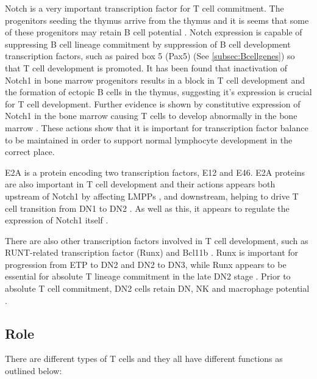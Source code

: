 Notch is a very important transcription factor for T cell commitment.
The progenitors seeding the thymus arrive from the thymus and it is seems that some of these progenitors may retain B cell potential \citep{Porritt2004}.
Notch expression is capable of suppressing B cell lineage commitment by suppression of B cell development transcription factors, such as paired box 5 (Pax5) (See \cref{subsec:Bcellgenes}) so that T cell development is promoted.
It has been found that inactivation of Notch1 in bone marrow progenitors results in a block in T cell development and the formation of ectopic B cells in the thymus, suggesting it's expression is crucial for T cell development.
Further evidence is shown by constitutive expression of Notch1 in the bone marrow causing T cells to develop abnormally in the bone marrow \citep{Radtke2013}.
These actions show that it is important for transcription factor balance to be maintained in order to support normal lymphocyte development in the correct place.

E2A is a protein encoding two transcription factors, E12 and E46.
E2A proteins are also important in T cell development and their actions appears both upstream of Notch1 by affecting LMPPs \citep{Dias2008}, and downstream, helping to drive T cell transition from DN1 to DN2 \citep{Naito2011}.
As well as this, it appears to regulate the expression of Notch1 itself \citep{Dias2008}.

There are also other transcription factors involved in T cell development, such as RUNT-related transcription factor (Runx) and Bcl11b \citep{Naito2011, Liu2010}.
Runx is important for progression from ETP to DN2 and DN2 to DN3, while Runx appears to be essential for absolute T lineage commitment in the late DN2 stage \citep{Liu2010, Naito2011}. 
Prior to absolute T cell commitment, DN2 cells retain DN, NK and macrophage potential \citep{Naito2011}.

\subsection{Role}
\label{subsec:Tcellfunctions}

There are different types of T cells and they all have different functions as outlined below:


